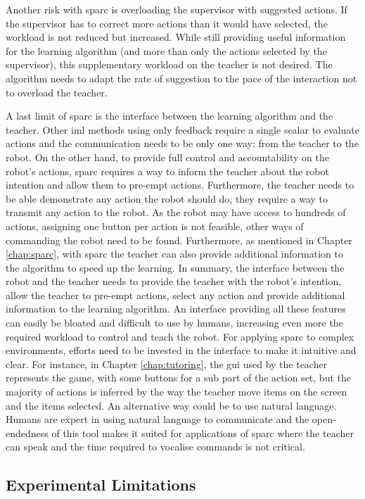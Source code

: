 Another risk with \gls{sparc} is overloading the supervisor with suggested actions. If the supervisor has to correct more actions than it would have selected, the workload is not reduced but increased. While still providing useful information for the learning algorithm (and more than only the actions selected by the supervisor), this supplementary workload on the teacher is not desired. The algorithm needs to adapt the rate of suggestion to the pace of the interaction not to overload the teacher.

A last limit of \gls{sparc} is the interface between the learning algorithm and the teacher. Other \gls{iml} methods using only feedback require a single scalar to evaluate actions and the communication needs to be only one way: from the teacher to the robot. On the other hand, to provide full control and accountability on the robot's actions, \gls{sparc} requires a way to inform the teacher about the robot intention and allow them to pre-empt actions. Furthermore, the teacher needs to be able demonstrate any action the robot should do, they require a way to transmit any action to the robot. As the robot may have access to hundreds of actions, assigning one button per action is not feasible, other ways of commanding the robot need to be found. Furthermore, as mentioned in Chapter \ref{chap:sparc}, with \gls{sparc} the teacher can also provide additional information to the algorithm to speed up the learning. In summary, the interface between the robot and the teacher needs to provide the teacher with the robot's intention, allow the teacher to pre-empt actions, select any action and provide additional information to the learning algorithm. An interface providing all these features can easily be bloated and difficult to use by humans, increasing even more the required workload to control and teach the robot. For applying \gls{sparc} to complex environments, efforts need to be invested in the interface to make it intuitive and clear. For instance, in Chapter \ref{chap:tutoring}, the \gls{gui} used by the teacher represents the game, with some buttons for a sub part of the action set, but the majority of actions is inferred by the way the teacher move items on the screen and the items selected. An alternative way could be to use natural language. Humans are expert in using natural language to communicate and the open-endedness of this tool makes it suited for applications of \gls{sparc} where the teacher can speak and the time required to vocalise commands is not critical.

\subsection{Experimental Limitations} \label{sec:disc_experiments} 



